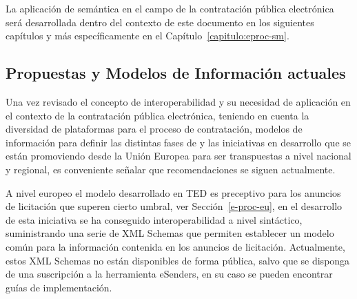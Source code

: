 La aplicación de semántica en el campo de la contratación pública
electrónica será desarrollada dentro del contexto de este documento
en los siguientes capítulos y más específicamente en el Capítulo~\ref{capitulo:eproc-sm}.

\subsection{Propuestas y Modelos de Información actuales}\label{data-model-eproc}
Una vez revisado el concepto de interoperabilidad y su necesidad de aplicación
en el contexto de la contratación pública electrónica, teniendo en cuenta
la diversidad de plataformas para el proceso de contratación, modelos de información para definir las distintas
fases de \eproc y las iniciativas en desarrollo que se están promoviendo desde la Unión
Europea para ser transpuestas a nivel nacional y regional, es conveniente señalar que recomendaciones
se siguen actualmente.

A nivel europeo el modelo desarrollado en TED es preceptivo para los anuncios de licitación
que superen cierto umbral, ver Sección~\ref{e-proc-eu}, en el desarrollo de esta iniciativa
se ha conseguido interoperabilidad a nivel sintáctico, suministrando una serie de \gls{XML Schema}s que 
permiten establecer un modelo común para la información contenida en los anuncios de licitación. Actualmente,
estos \gls{XML Schema}s no están disponibles de forma pública, salvo que se disponga de una suscripción a la herramienta
eSenders, en su caso se pueden encontrar guías de implementación. 


